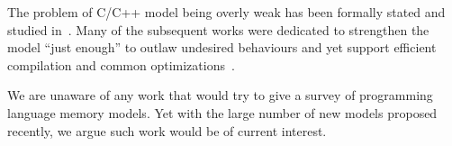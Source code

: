 The problem of C/C++ model being overly weak  has 
been formally stated and studied in~\cite{Batty-al:ESOP15}.
Many of the subsequent works were dedicated 
to strengthen the model ``just enough'' to outlaw undesired behaviours
and yet support efficient compilation and 
common optimizations~\cite{Jeffrey-Riely:LICS16, PichonPharabod-Sewell:POPL16, 
Podkopaev-al:CoRR16, Kang-al:POPL17, Chakraborty-Vafeiadis:POPL19, Lee-el:PLDI20}. 

We are unaware of any work that would try to give 
a survey of programming language memory models.
Yet with the large number of new models proposed recently,
we argue such work would be of current interest. 
